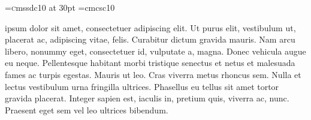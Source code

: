 \font\lettrine=cmssdc10 at 30pt
\font\scfont=cmcsc10
\hsize=24pc


\baselineskip\hangindent=1.8pc   ipsum dolor sit amet, consectetuer adipiscing elit. Ut purus elit, vestibulum ut, placerat ac,
adipiscing vitae, felis. Curabitur dictum gravida mauris. Nam arcu libero, nonummy eget,
consectetuer id, vulputate a, magna. Donec vehicula augue eu neque. Pellentesque 
habitant morbi tristique senectus et netus et malesuada fames ac turpis egestas. Mauris ut 
leo. Cras viverra metus rhoncus sem. Nulla et lectus vestibulum urna fringilla ultrices. 
Phasellus eu tellus sit amet tortor gravida placerat. Integer sapien est, iaculis in, pretium
quis, viverra ac, nunc. Praesent eget sem vel leo ultrices bibendum.
\bye